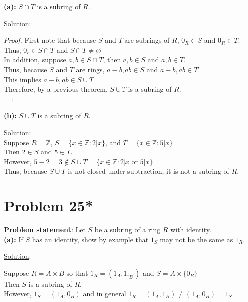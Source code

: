\documentclass{article} %
\begin{document}
\textbf{(a):} $S \cap T$ is a subring of $R$.
\\
\begin{addmargin}[1em]{0em}
\underline{Solution}:
\begin{addmargin}[1em]{0em}
\begin{proof}
First note that because $S$ and $T$ are subrings of $R$, $0_R \in S$ and $0_R \in T$.
\\Thus, $0_r \in S \cap T$ and $S \cap T \neq \varnothing$
\\In addition, suppose $a, b \in S \cap T$, then $a,b \in S$ and $a, b \in T$.
\\Thus, because $S$ and $T$ are rings, $a-b,ab \in S$ and $a-b, ab \in T$.
\\This implies $a-b, ab \in S \cup T$
\\Therefore, by a previous theorem, $S \cup T$ is a subring of $R$.
\\
\end{proof}
\end{addmargin}
\end{addmargin}    


\textbf{(b):} $S \cup T$ is a subring of $R$.
\\
\begin{addmargin}[1em]{0em}
\underline{Solution}: \\
Suppose $R = \mathbb{Z}$, $S = \{x \in \mathbb{Z} : 2|x\}$, and $T = \{x \in \mathbb{Z} : 5|x\}$
\\Then $2 \in S$ and $5 \in T$.
\\However, $5-2 = 3 \not\in S \cup T = \{x \in \mathbb{Z} : 2|x$ or $5|x\}$
\\Thus, because $S \cup T$ is not closed under subtraction, it is not a subring of $R$.
\end{addmargin}

\newpage


\section*{Problem 25*}


\textbf{Problem statement}: Let $S$ be a subring of a ring $R$ with identity.
\\

\textbf{(a):} If $S$ has an identity, show by example that $1_S$ may not be the same as $1_R$.
\\
\begin{addmargin}[1em]{0em}
\underline{Solution}:
\begin{addmargin}[1em]{0em}
Suppose $R = A \times B$ so that $1_R = (1_A, 1,_B)$ and $S = A \times \{0_B\}$
\\Then $S$ is a subring of $R$.
\\However, $1_S = (1_A, 0_B)$ and in general $1_R = (1_A, 1_B) \neq (1_A, 0_B) = 1_S$. \\
\end{addmargin}
\end{addmargin}    
\end{document}
